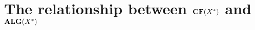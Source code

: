 \section{The relationship between \texorpdfstring{$\mbox{{\bf CF}}(X^*)$ and
$\mbox{{\bf ALG}}(X^*)$}{CF(X*) and ALG(X*)}}

